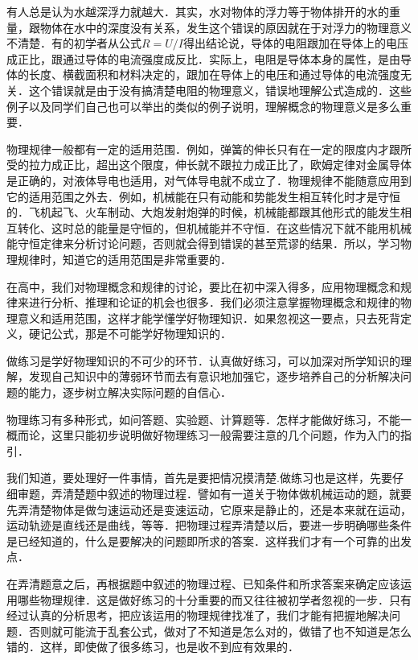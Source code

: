 有人总是认为水越深浮力就越大．其实，水对物体的浮力等于物体排开的水的重量，跟物体在水中的深度没有关系，发生这个错误的原因就在于对浮力的物理意义不清楚．有的初学者从公式$R=U/I$得出结论说，导体的电阻跟加在导体上的电压成正比，跟通过导体的电流强度成反比．实际上，电阻是导体本身的属性，是由导体的长度、横截面积和材料决定的，跟加在导体上的电压和通过导体的电流强度无关．这个错误就是由于没有搞清楚电阻的物理意义，错误地理解公式造成的．这些例子以及同学们自己也可以举出的类似的例子说明，理解概念的物理意义是多么重要．

物理规律一般都有一定的适用范围．例如，弹簧的伸长只有在一定的限度内才跟所受的拉力成正比，超出这个限度，伸长就不跟拉力成正比了，欧姆定律对金属导体是正确的，对液体导电也适用，对气体导电就不成立了．物理规律不能随意应用到它的适用范围之外去．例如，机械能在只有动能和势能发生相互转化时才是守恒的．飞机起飞、火车制动、大炮发射炮弹的时候，机械能都跟其他形式的能发生相互转化、这时总的能量是守恒的，但机械能并不守恒．在这些情况下就不能用机械能守恒定律来分析讨论问题，否则就会得到错误的甚至荒谬的结果．所以，学习物理规律时，知道它的适用范围是非常重要的．

在高中，我们对物理概念和规律的讨论，要比在初中深入得多，应用物理概念和规律来进行分析、推理和论证的机会也很多．我们必须注意掌握物理概念和规律的物理意义和适用范围，这样才能学懂学好物理知识．如果忽视这一要点，只去死背定义，硬记公式，那是不可能学好物理知识的．

\vspace*{0.5em}
\vspace*{0.5em}

做练习是学好物理知识的不可少的环节．认真做好练习，可以加深对所学知识的理解，发现自己知识中的薄弱环节而去有意识地加强它，逐步培养自己的分析解决问题的能力，逐步树立解决实际问题的自信心．

物理练习有多种形式，如问答题、实验题、计算题等．怎样才能做好练习，不能一概而论，这里只能初步说明做好物理练习一般需要注意的几个问题，作为入门的指引．

我们知道，要处理好一件事情，首先是要把情况摸清楚.做练习也是这样，先要仔细审题，弄清楚题中叙述的物理过程．譬如有一道关于物体做机械运动的题，就要先弄清楚物体是做匀速运动还是变速运动，它原来是静止的，还是本来就在运动，运动轨迹是直线还是曲线，等等．把物理过程弄清楚以后，要进一步明确哪些条件是已经知道的，什么是要解决的问题即所求的答案．这样我们才有一个可靠的出发点．

在弄清题意之后，再根据题中叙述的物理过程、已知条件和所求答案来确定应该运用哪些物理规律．这是做好练习的十分重要的而又往往被初学者忽视的一步．只有经过认真的分析思考，把应该运用的物理规律找准了，我们才能有把握地解决问题．否则就可能流于乱套公式，做对了不知道是怎么对的，做错了也不知道是怎么错的．这样，即使做了很多练习，也是收不到应有效果的．

